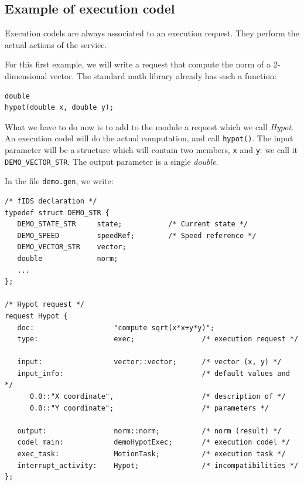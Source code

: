 \subsection{Example of execution codel}

Execution  codels are always associated  to   an execution request.  They
perform the actual actions of the service.

For this first example, we will write a request  that compute the norm of
a 2-dimensional vector. The standard math library already has such a
function:

\begin{center}\begin{cartouche}\small\begin{verbatim}
double
hypot(double x, double y);
\end{verbatim}\end{cartouche}\end{center}

What we have to do now  is to add  to the module  a request which we call
\emph{Hypot}. An execution codel will do  the actual computation, and call
\texttt{hypot()}. The input parameter will be a structure which will contain
two members, \texttt{x} and \texttt{y}: we call it \texttt{DEMO\_VECTOR\_STR}. The
output parameter is a single \emph{double}.

In the file \texttt{demo.gen}, we write:

\begin{center}\begin{cartouche}\small\begin{verbatim}
/* fIDS declaration */
typedef struct DEMO_STR {
   DEMO_STATE_STR     state;           /* Current state */
   DEMO_SPEED         speedRef;        /* Speed reference */
   DEMO_VECTOR_STR    vector;
   double             norm;
   ...
};

/* Hypot request */
request Hypot {
   doc:                   "compute sqrt(x*x+y*y)";
   type:                  exec;                /* execution request */

   input:                 vector::vector;      /* vector (x, y) */
   input_info:                                 /* default values and */
      0.0::"X coordinate",                     /* description of */
      0.0::"Y coordinate";                     /* parameters */
   
   output:                norm::norm;          /* norm (result) */
   codel_main:            demoHypotExec;       /* execution codel */
   exec_task:             MotionTask;          /* execution task */
   interrupt_activity:    Hypot;               /* incompatibilities */
};
\end{verbatim}\end{cartouche}\end{center}

